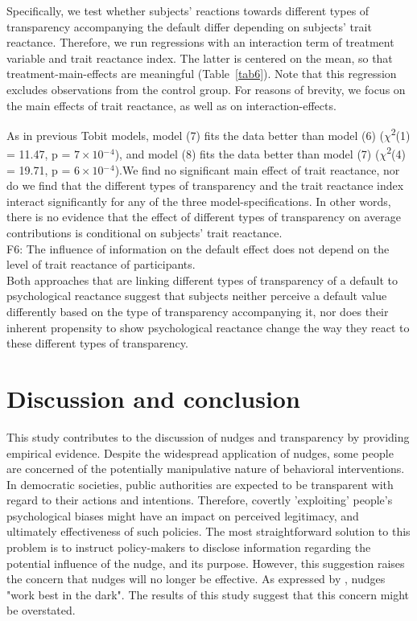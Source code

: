 \documentclass[review, authoryear,12pt]{elsarticle}
\begin{document}
Specifically, we test whether subjects' reactions towards different types of transparency accompanying the default differ depending on subjects' trait reactance. Therefore, we run regressions with an interaction term of treatment variable and trait reactance index. The latter is centered on the mean, so that treatment-main-effects are meaningful (Table~\ref{tab6}). Note that this regression excludes observations from the control group. For reasons of brevity, we focus on the main effects of trait reactance, as well as on interaction-effects.

As in previous Tobit models, model (7) fits the data better than model (6) ($\chi$\textsuperscript{2}(1) = 11.47, p = $7\times 10$$^-$$^4$), and model (8) fits the data better than model (7) ($\chi$\textsuperscript{2}(4) = 19.71, p = $6\times 10$$^-$$^4$).We find no significant main effect of trait reactance, nor do we find that the different types of transparency and the trait reactance index interact significantly for any of the three model-specifications. In other words, there is no evidence that the effect of different types of transparency on average contributions is conditional on subjects' trait reactance. \\

F6: The influence of information on the default effect does not depend on the level of trait reactance of participants. \\

Both approaches that are linking different types of transparency of a default to psychological reactance suggest that subjects neither perceive a default value differently based on the type of transparency accompanying it, nor does their inherent propensity to show psychological reactance change the way they react to these different types of transparency.

\section{Discussion and conclusion}
This study contributes to the discussion of nudges and transparency by providing empirical evidence. Despite the widespread application of nudges, some people are concerned of the potentially manipulative nature of behavioral interventions. In democratic societies, public authorities are expected to be transparent with regard to their actions and intentions. Therefore, covertly 'exploiting' people's psychological biases might have an impact on perceived legitimacy, and ultimately effectiveness of such policies. The most straightforward solution to this problem is to instruct policy-makers to disclose information regarding the potential influence of the nudge, and its purpose. However, this suggestion raises the concern that nudges will no longer be effective. As expressed by \cite{Bovens.2009}, nudges "work best in the dark". The results of this study suggest that this concern might be overstated. 
\end{document}
